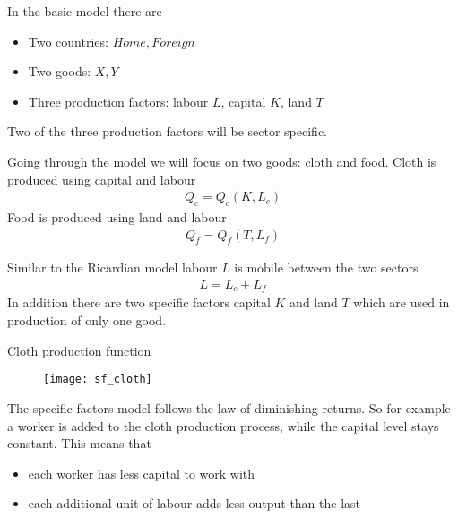 \documentclass{beamer}
\begin{document}
\begin{frame}
  In the basic model there are 
  \begin{itemize}
  \item Two countries: $Home, Foreign$ 
  \item Two goods: $X,Y$
  \item Three production factors: labour $L$, capital $K$, land $T$
  \end{itemize}
  \medskip
  Two of the three production factors will be sector specific.
\end{frame}

\begin{frame}
Going through the model we will focus on two goods: cloth and food.
Cloth is produced using capital and labour
  \begin{align*}
    Q_c=Q_c(K,L_c)
  \end{align*}
  \medskip
  Food is produced using land and labour
  \begin{align*}
    Q_f=Q_f(T,L_f)
  \end{align*}  
\end{frame}

\begin{frame}
 Similar to the Ricardian model labour $L$ is mobile between the two sectors
  \begin{align*}
    L=L_c+L_f
  \end{align*}
  \medskip
  In addition there are two specific factors capital $K$ and land $T$ which are used in production of only one good.
\end{frame}

\begin{frame}{Cloth production function}
  \begin{figure}
    \texttt{[image: sf\_cloth]}
  \end{figure}  
\end{frame}

\begin{frame}
  The specific factors model follows the law of diminishing returns.
  So for example a worker is added to the cloth production process, while the capital level stays constant.
  This means that 
  \begin{itemize}
    \item each worker has less capital to work with
    \item each additional unit of labour adds less output than the last
  \end{itemize}
\end{frame}
\end{document}
